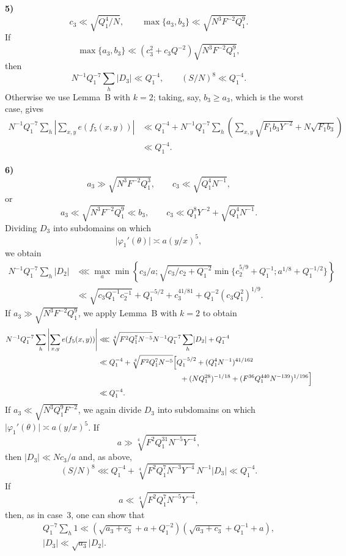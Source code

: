 \documentclass[10pt]{article}
\begin{document}
\medskip
\noindent\textbf{5)}
\[
  c_3\ll\sqrt{Q_1^4/N},
  \qquad
  \max\{a_3,b_3\}\ll\sqrt{N^3F^{-2}Q_1^9}.
\]
If
\[
  \max\{a_3,b_3\}\ll
  (c_3^2+c_3Q^{-2})\sqrt{N^3F^{-2}Q_1^9},
\]
then
\[
  N^{-1}Q_1^{-7}\sum_h\lvert D_3\rvert\ll Q_1^{-4},
  \qquad (S/N)^8\ll Q_1^{-4}.
\]
Otherwise we use Lemma~B with $k=2$; taking, say, $b_3\geqslant a_3$, which is the worst case, gives
\[
\begin{aligned}
N^{-1}Q_1^{-7}\sum_h
 \left\lvert\sum_{x,y}e(f_5(x,y))\right\rvert
&\ll Q_1^{-4}+N^{-1}Q_1^{-7}\sum_h\left(
 \sum_{x,y}\sqrt{F_1b_3Y^{-2}}+N\sqrt{F_1b_3}
 \right)\\
&\ll Q_1^{-4}.
\end{aligned}
\]

\medskip
\noindent\textbf{6)}
\[
  a_3\gg\sqrt{N^3F^{-2}Q_1^3},
  \qquad c_3\ll\sqrt{Q_1^4N^{-1}},
\]
or
\[
  a_3\ll\sqrt{N^3F^{-2}Q_1^9}\ll b_3,
  \qquad
  c_3\ll Q_1^8Y^{-2}+\sqrt{Q_1^4N^{-1}}.
\]
Dividing $D_3$ into subdomains on which
\[
  \lvert\varphi_1'(\theta)\rvert\asymp a(y/x)^5,
\]
we obtain
\[
\begin{aligned}
N^{-1}Q_1^{-7}\sum_h\lvert D_2\rvert
&\lll\max_a\min\left\{
 c_3/a;
 \sqrt{c_3/c_2+Q_1^{-2}}
 \min\{c_2^{5/9}+Q_1^{-1};a^{1/8}+Q_1^{-1/2}\}
 \right\}\\
&\ll\sqrt{c_3Q_1^{-1}c_2^{-1}}+Q_1^{-5/2}
 +c_3^{41/81}+Q_1^{-2}(c_3Q_1^2)^{1/9}.
\end{aligned}
\]
If $a_3\gg\sqrt{N^3F^{-2}Q_1^9}$, we apply Lemma~B with $k=2$ to obtain
\[
\begin{aligned}
N^{-1}Q_1^{-7}\sum_h
 \left\lvert\sum_{x,y}e(f_5(x,y))\right\rvert
&\lll \sqrt[4]{F^2Q_1^7N^{-5}}
 N^{-1}Q_1^{-7}\sum_h\lvert D_2\rvert+Q_1^{-4}\\
&\ll Q_1^{-4}+\sqrt[4]{F^2Q_1^7N^{-5}}
 \Bigl[Q_1^{-5/2}+(Q_1^4N^{-1})^{41/162}\\
&\hspace{39mm}+(NQ_1^{28})^{-1/18}
 +(F^{36}Q_1^{440}N^{-139})^{1/196}\Bigr]\\
&\ll Q_1^{-4}.
\end{aligned}
\]
If $a_3\ll\sqrt{N^3Q_1^9F^{-2}}$, we again divide $D_3$ into subdomains on which
$\lvert\varphi_1'(\theta)\rvert\asymp a(y/x)^5$. If
\[
  a\gg\sqrt[4]{F^2Q_1^{31}N^{-5}Y^{-4}},
\]
then $\lvert D_3\rvert\ll Nc_3/a$ and, as above,
\[
  (S/N)^8\lll Q_1^{-4}
  +\sqrt[4]{F^2Q_1^7N^{-3}Y^{-4}}\,N^{-1}\lvert D_3\rvert
  \ll Q_1^{-4}.
\]
If
\[
  a\ll\sqrt[4]{F^2Q_1^7N^{-5}Y^{-4}},
\]
then, as in case~3, one can show that
\[
\begin{gathered}
 Q_1^{-7}\sum_h1\ll
 (\sqrt{a_3+c_3}+a+Q_1^{-2})
 (\sqrt{a_3+c_3}+Q_1^{-1}+a),\\
 \lvert D_3\rvert\ll\sqrt{a_3}\lvert D_2\rvert.
\end{gathered}
\]
\end{document}
